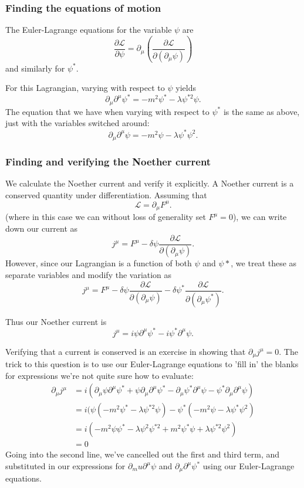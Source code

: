 \documentclass[11pt, oneside]{article}   	%
\theoremstyle{newline}
\theoremstyle{newline}
\theoremstyle{newline}
\theoremstyle{newline}
\theoremstyle{newline}
\newcommand{\Lagr}{\mathcal{L}}
\begin{document}
\subsubsection*{Finding the equations of motion} 
The Euler-Lagrange equations for the variable $\psi$ are 
\[
\frac{\partial \Lagr}{\partial \psi } = \partial_{\mu} \left( \frac{\partial \Lagr}{\partial (\partial_{\mu} \psi)} \right) 
\]
and similarly for $\psi^*$. 

For this Lagrangian, varying with respect to $\psi$ yields 
\[
\partial_{\mu} \partial^\mu \psi^* = - m^2 \psi^* - \lambda \psi^{*2}  \psi. 
\]
The equation that we have when varying with respect to $\psi^*$ is the same as above, just with the variables switched around: 
\[ 
\partial_\mu \partial^\mu \psi  = -m^2 \psi - \lambda \psi^* \psi^2. 
\]

\subsubsection*{Finding and verifying the Noether current}
We calculate the Noether current and verify it explicitly. A Noether current is a conserved quantity under differentiation. Assuming that 
\[
\Lagr = \partial_\mu F^\mu. 
\]
(where in this case we can without loss of generality set $F^{\mu} = 0$), we can write down our current as 
\[ 
j^{\mu} = F^{\mu} - \delta \psi   \frac{\partial \Lagr}{ \partial \left (  \partial_\mu \psi  \right) }. 
\]
However, since our Lagrangian is a function of both $\psi $ and $\psi*$, we treat these as separate variables and modify the variation as 
\[
j^{\mu} = F^{\mu} - \delta \psi   \frac{\partial \Lagr}{ \partial \left (  \partial_\mu \psi  \right) }  - \delta \psi^*  \frac{\partial \Lagr}{ \partial \left (  \partial_\mu \psi^*  \right) }. 
\]

Thus our Noether current is 
\[ 
j^{\mu} = i \psi \partial^\mu \psi^* - i \psi^* \partial^{\mu} \psi. 
\]

Verifying that a current is conserved is an exercise in showing that $\partial_\mu j^\mu = 0 $. The trick to this question is to use our Euler-Lagrange equations to 'fill in' the blanks for expressions we're not quite sure how to evaluate: 
\begin{align*} 
\partial_\mu j^\mu  &= i ( \partial_\mu \psi \partial^\mu \psi^* + \psi \partial_\mu \partial^\mu \psi^*  - \partial_\mu \psi^* \partial^\mu \psi  - \psi^* \partial_\mu \partial^\mu \psi) \\
&= i ( \psi (  - m^2 \psi^*  - \lambda \psi^{ * 2} \psi )  - \psi^* (  - m^2 \psi  - \lambda \psi^* \psi^2 ) \\
&= i ( - m^2 \psi \psi^*  - \lambda \psi^2 \psi^{ * 2 } + m^2 \psi^* \psi + \lambda \psi^{ * 2} \psi^2 ) \\
& = 0 
\end{align*} 
Going into the second line, we've cancelled out the first and third term, and substituted in our expressions for $\partial_mu \partial^\mu \psi $ and $\partial_\mu \partial^\mu \psi^* $ using our Euler-Lagrange equations. 
\end{document}
